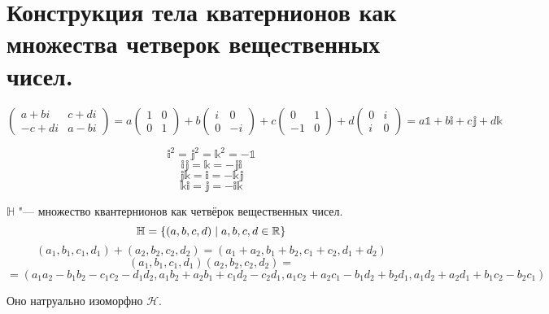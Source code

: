\section{Конструкция тела кватернионов как множества четверок вещественных чисел.}
$$\left(\begin{matrix}a + bi & c+di \\ -c+di & a-bi\end{matrix}\right) = a \left(\begin{matrix}1 & 0 \\ 0 & 1\end{matrix}\right) + b \left(\begin{matrix}i & 0 \\ 0 & -i\end{matrix}\right) + c\left(\begin{matrix}0 & 1 \\ -1 & 0\end{matrix}\right) + d\left(\begin{matrix}0 & i \\ i & 0\end{matrix}\right) = a\mathbb{1} + b\mathbb{i} + c\mathbb{j} + d\mathbb{k}$$

$$\mathbb{i}^2 = \mathbb{j}^2 = \mathbb{k}^2 = -\mathbb{1}$$
$$\mathbb{ij} = \mathbb{k} = -\mathbb{ji}$$
$$\mathbb{jk} = \mathbb{i} = -\mathbb{kj}$$
$$\mathbb{ki} = \mathbb{j} = -\mathbb{ik}$$

\begin{Def}
$\mathbb{H}$ "--- множество квантернионов как четвёрок вещественных чисел.
$$\mathbb{H} = \left\{(a, b, c, d) \mid a, b, c, d \in \mathbb{R}\right\}$$
$$(a_1, b_1, c_1, d_1) + (a_2, b_2, c_2, d_2) = (a_1 + a_2, b_1 + b_2, c_1 + c_2, d_1 + d_2)$$
$$(a_1, b_1, c_1, d_1) (a_2, b_2, c_2, d_2) = $$
$$ = (a_1a_2 - b_1b_2 - c_1c_2 - d_1d_2, a_1b_2 + a_2b_1 + c_1d_2 - c_2d_1, a_1c_2 + a_2c_1 - b_1d_2 + b_2d_1, a_1d_2 + a_2d_1 + b_1c_2 - b_2c_1)$$
\end{Def}
Оно натруально изоморфно $\mathcal{H}$.